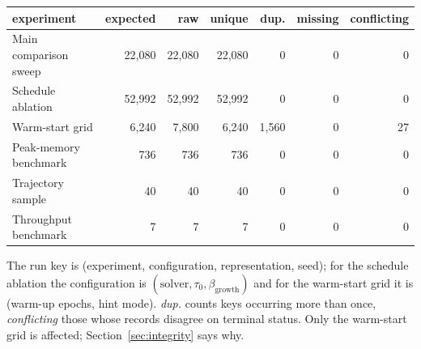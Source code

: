 \begin{table}[htbp]
{\small\begin{tabular}{lrrrrrr}
\toprule
experiment & expected & raw & unique & dup. & missing & conflicting \\
\midrule
Main comparison sweep & 22,080 & 22,080 & 22,080 & 0 & 0 & 0 \\
Schedule ablation & 52,992 & 52,992 & 52,992 & 0 & 0 & 0 \\
Warm-start grid & 6,240 & 7,800 & 6,240 & 1,560 & 0 & 27 \\
Peak-memory benchmark & 736 & 736 & 736 & 0 & 0 & 0 \\
Trajectory sample & 40 & 40 & 40 & 0 & 0 & 0 \\
Throughput benchmark & 7 & 7 & 7 & 0 & 0 & 0 \\
\bottomrule
\end{tabular}}
{The run key is (experiment, configuration, representation, seed); for the schedule ablation the configuration is $(\text{solver},\tau_0,\beta_{\mathrm{growth}})$ and for the warm-start grid it is (warm-up epochs, hint mode). \emph{dup.} counts keys occurring more than once, \emph{conflicting} those whose records disagree on terminal status. Only the warm-start grid is affected; Section~\ref{sec:integrity} says why.}
\end{table}
